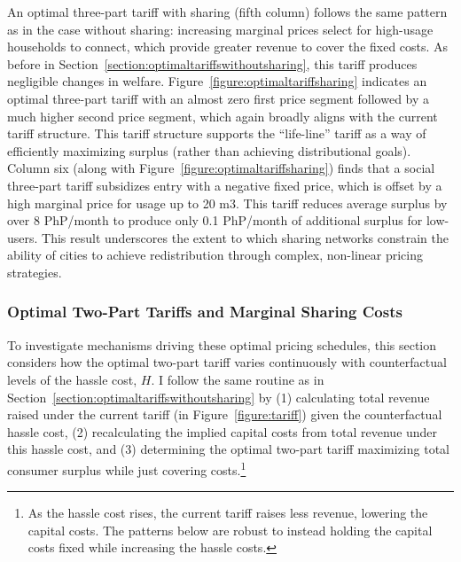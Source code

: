 \documentclass[12pt]{article}
\begin{document}

An optimal three-part tariff with sharing (fifth column) follows the same pattern as in the case without sharing: increasing marginal prices select for high-usage households to connect, which provide greater revenue to cover the fixed costs.  As before in Section~\ref{section:optimaltariffswithoutsharing}, this tariff produces negligible changes in welfare.  Figure~\ref{figure:optimaltariffsharing} indicates an optimal three-part tariff with an almost zero first price segment followed by a much higher second price segment, which again broadly aligns with the current tariff structure.  This tariff structure supports the ``life-line'' tariff as a way of efficiently maximizing surplus (rather than achieving distributional goals).  Column six (along with Figure~\ref{figure:optimaltariffsharing}) finds that a social three-part tariff subsidizes entry with a negative fixed price, which is offset by a high marginal price for usage up to 20 m3.  This tariff reduces average surplus by over 8 PhP/month to produce only 0.1 PhP/month of additional surplus for low-users.  This result underscores the extent to which sharing networks constrain the ability of cities to achieve redistribution through complex, non-linear pricing strategies.




\subsubsection{Optimal Two-Part Tariffs and Marginal Sharing Costs}\label{section:tptsharingcosts}
To investigate mechanisms driving these optimal pricing schedules, this section considers how the optimal two-part tariff varies continuously with counterfactual levels of the hassle cost, $H$.  I follow the same routine as in Section~\ref{section:optimaltariffswithoutsharing} by (1) calculating total revenue raised under the current tariff (in Figure~\ref{figure:tariff}) given the counterfactual hassle cost, (2) recalculating the implied capital costs from total revenue under this hassle cost, and (3) determining the optimal two-part tariff maximizing total consumer surplus while just covering costs.\footnote{As the hassle cost rises, the current tariff raises less revenue, lowering the capital costs.  The patterns below are robust to instead holding the capital costs fixed while increasing the hassle costs.}
\end{document}
